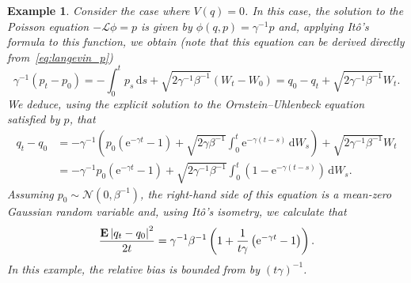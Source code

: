 \documentclass[11pt,a4paper]{article}
\newcommand{\e}{\mathrm{e}}
\newcommand{\expect}[0]{\mathbf{E}}
\renewcommand{\d}{\mathrm d}
\theoremstyle{plain}
\newtheorem{example}{Example}[section]
\numberwithin{equation}{section}
\begin{document}
\begin{example}
    Consider the case where $V(q) = 0$.
    In this case, the solution to the Poisson equation $- \mathcal L \phi = p$ is given by $\phi(q, p) = \gamma^{-1} p$ and,
    applying Itô's formula to this function, we obtain
    (note that this equation can be derived directly from~\eqref{eq:langevin_p})
    \[
        \gamma^{-1}(p_t - p_0) = - \int_{0}^{t} p_s \, \d s + \sqrt{2 \gamma^{-1} \beta^{-1}} (W_t - W_0)
        = q_0 - q_t + \sqrt{2 \gamma^{-1} \beta^{-1}} W_t.
    \]
    We deduce, using the explicit solution to the Ornstein--Uhlenbeck equation satisfied by $p$, that
    \begin{align*}
        q_t - q_0
        &= - \gamma^{-1} \left( p_0 \left(\e^{-\gamma t} - 1\right) + \sqrt{2 \gamma \beta^{-1}}\int_{0}^{t} \e^{-\gamma (t - s)} \, \d W_s \right)
        + \sqrt{2 \gamma^{-1} \beta^{-1}} W_t \\
        &=  - \gamma^{-1} p_0 \left(\e^{-\gamma t} - 1\right) + \sqrt{2 \gamma^{-1} \beta^{-1}}\int_{0}^{t} \left(1 - \e^{-\gamma (t - s)}\right) \, \d W_s.
    \end{align*}
    Assuming $p_0 \sim \mathcal N(0, \beta^{-1})$,
    the right-hand side of this equation is a mean-zero Gaussian random variable and,
    using It\^o's isometry, we calculate that
    \[
        \frac{\expect \abs{q_t - q_0}^2}{2t} = \gamma^{-1} \beta^{-1} \left( 1 + \frac{1}{t \gamma} \left(\e^{-\gamma t} - 1\right) \right).
    \]
    In this example, the relative bias is bounded from by $(t \gamma)^{-1}$.
\end{example}
\end{document}
